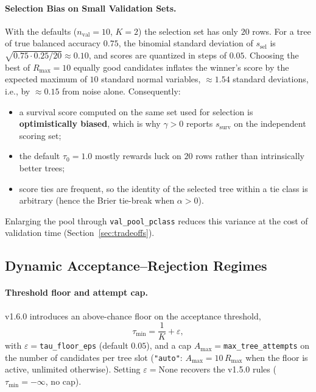 \documentclass[11pt,a4paper]{article}
\newcommand{\code}[1]{\texttt{#1}}
\begin{document}
\paragraph{Selection Bias on Small Validation Sets.}
With the defaults ($n_{\text{val}} = 10$, $K = 2$) the selection set has only $20$ rows. For a tree of true balanced accuracy $0.75$, the binomial standard deviation of $s_{\text{sel}}$ is $\sqrt{0.75 \cdot 0.25 / 20} \approx 0.10$, and scores are quantized in steps of $0.05$. Choosing the best of $R_{\max} = 10$ equally good candidates inflates the winner's score by the expected maximum of $10$ standard normal variables, $\approx 1.54$ standard deviations, i.e., by $\approx 0.15$ from noise alone. Consequently:
\begin{itemize}[leftmargin=*, itemsep=2pt]
  \item a survival score computed on the same set used for selection is \textbf{optimistically biased}, which is why $\gamma > 0$ reports $s_{\text{surv}}$ on the independent scoring set;
  \item the default $\tau_0 = 1.0$ mostly rewards luck on $20$ rows rather than intrinsically better trees;
  \item score ties are frequent, so the identity of the selected tree within a tie class is arbitrary (hence the Brier tie-break when $\alpha > 0$).
\end{itemize}
Enlarging the pool through \code{val\_pool\_pclass} reduces this variance at the cost of validation time (Section~\ref{sec:tradeoffs}).

\subsection{Dynamic Acceptance--Rejection Regimes}
\label{sec:regimes}

\paragraph{Threshold floor and attempt cap.} v1.6.0 introduces an above-chance floor on the acceptance threshold,
\begin{equation}
  \tau_{\min} = \frac{1}{K} + \varepsilon,
\end{equation}
with $\varepsilon = {}$\code{tau\_floor\_eps} (default $0.05$), and a cap $A_{\max} = {}$\code{max\_tree\_attempts} on the number of candidates per tree slot (\code{"auto"}: $A_{\max} = 10\,R_{\max}$ when the floor is active, unlimited otherwise). Setting $\varepsilon = {}$None recovers the v1.5.0 rules ($\tau_{\min} = -\infty$, no cap).
\end{document}
